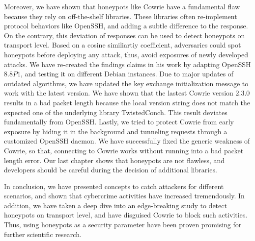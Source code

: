 Moreover, we have shown that honeypots like Cowrie have a fundamental flaw because they rely on off-the-shelf libraries.
These libraries often re-implement protocol behaviors like OpenSSH, and adding a subtle difference to the response.
On the contrary, this deviation of responses can be used to detect honeypots on transport level.
Based on a cosine similiartiy coefficient, adversaries could spot honeypots before deploying any attack, thus, avoid exposures of newly developed attacks.
We have re-created the findings \citet{vetterl2020} claims in his work by adapting OpenSSH $8.8P1$, and testing it on different Debian instances.
Due to major updates of outdated algorithms, we have updated the key exchange initialization message to work with the latest version.
We have shown that the lastest Cowrie version $2.3.0$ results in a bad packet length because the local version string does not match the expected one of the underlying library TwistedConch.
This result deviates fundamentally from OpenSSH.
Lastly, we tried to protect Cowrie from early exposure by hiding it in the background and tunneling requests through a customized OpenSSH daemon.
We have successfully fixed the generic weakness of Cowrie, so that, connecting to Cowrie works without running into a bad packet length error.
Our last chapter shows that honeypots are not flawless, and developers should be careful during the decision of additional libraries.

In conclusion, we have presented concepts to catch attackers for different scenarios, and shown that cybercrime activities have increased tremendously.
In addition, we have taken a deep dive into an edge-breaking study to detect honeypots on transport level, and have disguised Cowrie to block such activities.
Thus, using honeypots as a security parameter have been proven promising for further scientific research.
